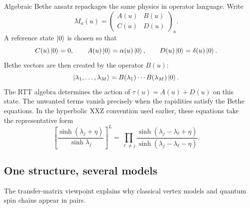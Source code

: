 Algebraic Bethe ansatz repackages the same physics in operator language.  Write
\begin{equation}
\label{eq:conclusion-aba-monodromy-entries}
    M_a(u)
    =
    \begin{pmatrix}
        A(u) & B(u)\\
        C(u) & D(u)
    \end{pmatrix}_a .
\end{equation}
A reference state \(\left|0\right\rangle\) is chosen so that
\begin{equation}
\label{eq:conclusion-pseudovacuum}
    C(u)\left|0\right\rangle=0,
    \qquad
    A(u)\left|0\right\rangle=\alpha(u)\left|0\right\rangle,
    \qquad
    D(u)\left|0\right\rangle=\delta(u)\left|0\right\rangle.
\end{equation}
Bethe vectors are then created by the operator \(B(u)\):
\begin{equation}
\label{eq:conclusion-bethe-vector}
    \left|\lambda_1,\ldots,\lambda_M\right\rangle
    =
    B(\lambda_1)\cdots B(\lambda_M)\left|0\right\rangle.
\end{equation}
The RTT algebra determines the action of \(\tau(u)=A(u)+D(u)\) on this state.  The unwanted terms vanish precisely when the rapidities satisfy the Bethe equations.  In the hyperbolic XXZ convention used earlier, these equations take the representative form
\begin{equation}
\label{eq:conclusion-aba-bethe-equations}
    \left[
    \frac{\sinh(\lambda_j+\eta)}{\sinh\lambda_j}
    \right]^L
    =
    \prod_{\ell\neq j}
    \frac{\sinh(\lambda_j-\lambda_\ell+\eta)}
         {\sinh(\lambda_j-\lambda_\ell-\eta)} .
\end{equation}

\subsection{One structure, several models}

The transfer-matrix viewpoint explains why classical vertex models and quantum spin chains appear in pairs.

